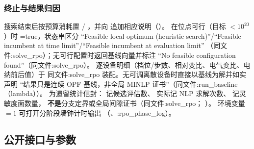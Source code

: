 \subsubsection*{终止与结果归因}
搜索结束后按预算消耗置 /
，并向 
追加相应说明（）。
在位点可行（目标 $<10^{20}$）时 =true，状态串区分
“Feasible local optimum (heuristic search)”/“Feasible incumbent at time
limit”/“Feasible incumbent at evaluation limit”
（同文件:solve\_rpo）；无可行配置时返回基线向量并标注
“No feasible configuration found”（同文件:solve\_rpo）。
逐设备明细（档位/步数、相对变比、电气变比、电纳前后值）于
同文件:solve\_rpo 装配。无可调离散设备时直接以基线为解并如实声明
“结果只是连续 OPF 基线，非全局 MINLP 证书”（同文件:run\_baseline（lambda））。
 为遗留统计信封： 记候选评估数、
 实际记 NLP 求解次数、 记灵敏度面数量，
\textbf{不是}分支定界或全局间隙证书（同文件:solve\_rpo；
）。
环境变量 ${}=1$ 可打开分阶段墙钟计时输出
（、:rpo\_phase\_log）。

\subsection{公开接口与参数}

